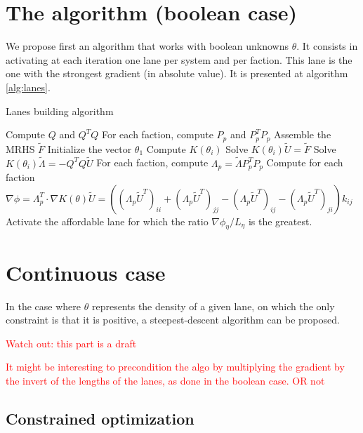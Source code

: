\documentclass[11pt,a4paper]{article}		%
\begin{document}
\section{The algorithm (boolean case)}

We propose first an algorithm that works with boolean unknowns $\theta$. It consists in activating at each iteration one lane per system and per faction. This lane is the one with the strongest gradient (in absolute value). It is presented at algorithm \ref{alg:lanes}.

\begin{algorithm}[ht]
	\caption{Lanes building algorithm}
	\label{alg:lanes}
	\begin{algorithmic}
		\STATE Compute $Q$ and $Q^TQ$
		\STATE For each faction, compute $P_p$ and $P_p^TP_p$
		\STATE Assemble the MRHS $\tilde{F}$
		\STATE Initialize the vector $\theta_1$
			\STATE Compute $K(\theta_i)$
			\STATE Solve $K(\theta_i)\tilde{U} = \tilde{F}$
			\STATE Solve $K(\theta_i)\tilde{\Lambda} = - Q^TQ\tilde{U}$
			\STATE For each faction, compute $\Lambda_p = \tilde{\Lambda}P_p^TP_p$
			\STATE Compute for each faction $\nabla\phi = \Lambda_p^T \cdot \nabla K(\theta) \tilde{U} = \left( ( \Lambda_p\tilde{U}^T )_{ii} + ( \Lambda_p\tilde{U}^T )_{jj} - ( \Lambda_p\tilde{U}^T )_{ij} - ( \Lambda_p\tilde{U}^T )_{ji} \right) k_{ij}$
					\STATE Activate the affordable lane for which the ratio $\nabla\phi_\eta / L_\eta$ is the greatest.
				\ENDFOR
			\ENDFOR
		\ENDFOR
	\end{algorithmic}
\end{algorithm}

\section{Continuous case}

In the case where $\theta$ represents the density of a given lane, on which the only constraint is that it is positive, a steepest-descent algorithm can be proposed.

\textcolor{red}{Watch out: this part is a draft}

\textcolor{red}{It might be interesting to precondition the algo by multiplying the gradient by the invert of the lengths of the lanes, as done in the boolean case. OR not}

\subsection{Constrained optimization}
\end{document}
